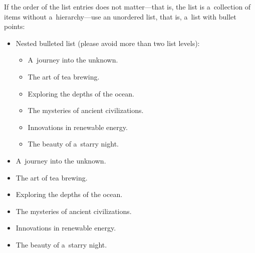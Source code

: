 \documentclass[12pt, a4paper, oneside]{article}
\renewcommand{\caps}[1]{{\textscale{0.97}{\textls[50]{\MakeUppercase{#1}}}}}
\theoremstyle{Plain}
\theoremstyle{Definition}
\theoremstyle{Remark}
\begin{document}
\newcommand{\testlist}{%
	\item A~journey into the unknown.
	\item The art of tea brewing.
	\item Exploring the depths of the ocean.
	\item The mysteries of ancient civilizations.
	\item Innovations in renewable energy.
	\item The beauty of a~starry night.
}

If the order of the list entries does not matter---that is, the list is a~collection of items without a~hierarchy---use an unordered list, that is, a~list with bullet points:
\begin{itemize}
	\item Nested bulleted list (please avoid more than two list levels):
		\begin{itemize}
			\testlist
		\end{itemize}
	\testlist
\end{itemize}

\renewcommand{\testlist}{%
	\item We first provide an overview of the foundational concepts in LaTeX, including its purpose as a~typesetting system that is particularly well-suited for producing complex documents such as academic papers and theses. LaTeX allows for precise control over document structure and formatting, making it a~preferred choice for many professionals in academia and research.
	\item We delve into\footnote{This text was \caps{AI}-generated \textellipsis} the various environments available in LaTeX, such as the \texttt{itemize} and \texttt{enumerate} environments. Each environment serves a~different purpose, with \texttt{itemize} creating bullet points and \texttt{enumerate} generating numbered lists.
	\item We discuss the importance of packages in LaTeX, which enhance its functionality. Packages like \texttt{amsmath} for advanced mathematical typesetting and \texttt{graphicx} for including images are essential for expanding the capabilities of basic LaTeX. Users should familiarize themselves with how to include and utilize these packages to maximize their LaTeX experience.
	\item Lastly, we explore the common pitfalls and troubleshooting tips for LaTeX users. Issues such as compilation errors, misformatted text, and missing packages can often arise. Knowing how to read error messages and where to find help, such as online forums and documentation, can significantly improve the user experience and help resolve issues efficiently.
}
\end{document}
